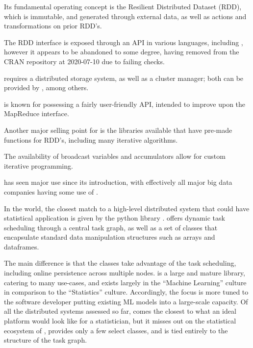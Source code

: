 Its fundamental operating concept is the Resilient Distributed Dataset (RDD), which is immutable, and generated through external data, as well as actions and transformations on prior RDD's.

The RDD interface is exposed through an API in various languages, including \R{}, however it appears to be abandoned to some degree, having removed from the CRAN repository at 2020-07-10 due to failing checks.

 requires a distributed storage system, as well as a cluster
manager; both can be provided by , among others.

 is known for possessing a fairly user-friendly API, intended to
improve upon the MapReduce interface.

Another major selling point for  is the libraries available that have pre-made functions for RDD's, including many iterative algorithms.

The availability of broadcast variables and accumulators allow for custom iterative programming.

 has seen major use since its introduction, with effectively all
major big data companies having some use of .

In the  world, the closest match to a high-level distributed system that could have statistical application is given by the python library \cite{rocklin2015dask}.
 offers
dynamic task scheduling through a central task graph, as well as a set
of classes that encapsulate standard data manipulation structures such
as  arrays and  dataframes.

The main difference is that the  classes take advantage of the task scheduling, including online persistence across multiple nodes.
 is a large and mature library, catering to many use-cases,
and exists largely in the  ``Machine Learning'' culture in
comparison to the \R{} ``Statistics'' culture.
Accordingly, the focus is more tuned to the  software developer putting existing ML models into a large-scale capacity.
Of all the distributed systems assessed so far,  comes the closest to what an ideal platform would look like for a statistician, but it misses out on the statistical ecosystem of \R{}, provides only a few select classes, and is tied entirely to the structure of the task graph.
